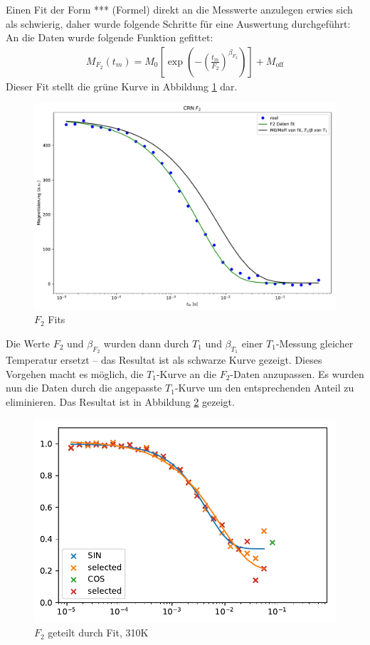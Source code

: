 Einen Fit der Form *** (Formel) direkt an die Messwerte anzulegen erwies sich als schwierig, daher wurde folgende Schritte für eine Auswertung durchgeführt: An die Daten wurde folgende Funktion gefittet:
\begin{align}
	M_{F_2} (t_m) = M_0 \left[ \exp{ \left(- { \left( \frac{t_m}{F_2} \right) }^{\beta_{F_2}} \right)} \right] + M_\text{off} \label{eqn:res:F_2_fit}
\end{align}
Dieser Fit stellt die grüne Kurve in Abbildung \ref{fig:res:F_2_fit} dar.
\begin{figure}
	\begin{center}
		\includegraphics[width=\textwidth]{graphics/plots/F2/f2_fits.pdf}
	\end{center}
	\caption{$F_2$ Fits} \label{fig:res:F_2_fit}
\end{figure}
Die Werte $F_2$ und $\beta_{F_2}$ wurden dann durch $T_1$ und $\beta_{T_1}$ einer $T_1$-Messung gleicher Temperatur ersetzt -- das Resultat ist als schwarze Kurve gezeigt. Dieses Vorgehen macht es möglich, die $T_1$-Kurve an die $F_2$-Daten anzupassen. Es wurden nun die Daten durch die angepasste $T_1$-Kurve um den entsprechenden Anteil zu eliminieren. Das Resultat ist in Abbildung \ref{fig:res:F_2_T_1} gezeigt.
\begin{figure}
	\begin{center}
		\includegraphics[width=\textwidth]{graphics/plots/F2/f2_fit.pdf}
	\end{center}
	\caption{$F_2$ geteilt durch Fit, 310K} \label{fig:res:F_2_T_1}
\end{figure}
